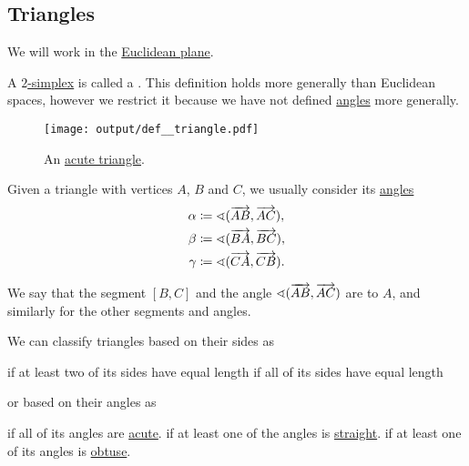 \subsection{Triangles}\label{subsec:triangles}

We will work in the \hyperref[def:euclidean_plane]{Euclidean plane}.

\begin{definition}\label{def:triangle}
  A \hyperref[def:simplex]{\( 2 \)-simplex} is called a . This definition holds more generally than Euclidean spaces, however we restrict it because we have not defined \hyperref[def:angle]{angles} more generally.

  \begin{figure}[!ht]
    \centering
    \texttt{[image: output/def\_\_triangle.pdf]}
    \caption{An \hyperref[def:triangle/acute]{acute triangle}.}\label{fig:def:triangle}
  \end{figure}

  Given a triangle with vertices \( A \), \( B \) and \( C \), we usually consider its \hyperref[def:angle]{ angles}
  \begin{align*}
    \alpha &\coloneqq \sphericalangle(\overrightarrow{AB}, \overrightarrow{AC}), \\
    \beta  &\coloneqq \sphericalangle(\overrightarrow{BA}, \overrightarrow{BC}), \\
    \gamma &\coloneqq \sphericalangle(\overrightarrow{CA}, \overrightarrow{CB}).
  \end{align*}

  We say that the segment \( [B, C] \) and the angle \( \sphericalangle(\overrightarrow{AB}, \overrightarrow{AC}) \) are  to \( A \), and similarly for the other segments and angles.

  We can classify triangles based on their sides as
  \begin{thmenum}
      if at least two of its sides have equal length
      if all of its sides have equal length
  \end{thmenum}
  or based on their angles as
  \begin{thmenum}
      if all of its angles are \hyperref[def:angle/measure/acute]{acute}.
      if at least one of the angles is \hyperref[def:angle/measure/straight]{straight}.
      if at least one of its angles is \hyperref[def:angle/measure/obtuse]{obtuse}.
  \end{thmenum}
\end{definition}

